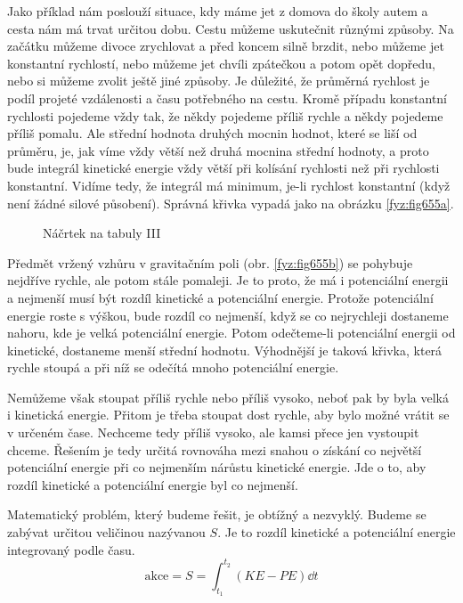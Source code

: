     Jako příklad nám poslouží situace, kdy máme jet z domova do školy autem a cesta nám má trvat
    určitou dobu. Cestu můžeme uskutečnit různými způsoby. Na začátku můžeme divoce zrychlovat a
    před koncem silně brzdit, nebo můžeme jet konstantní rychlostí, nebo můžeme jet chvíli zpátečkou
    a potom opět dopředu, nebo si můžeme zvolit ještě jiné způsoby. Je důležité, že průměrná
    rychlost je podíl projeté vzdálenosti a času potřebného na cestu. Kromě případu konstantní
    rychlosti pojedeme vždy tak, že někdy pojedeme příliš rychle a někdy pojedeme příliš pomalu. Ale
    střední hodnota druhých mocnin hodnot, které se liší od průměru, je, jak víme vždy větší než
    druhá mocnina střední hodnoty, a proto bude integrál kinetické energie vždy větší při kolísání
    rychlosti než při rychlosti konstantní. Vidíme tedy, že integrál má minimum, je-li rychlost
    konstantní (když není žádné silové působení). Správná křivka vypadá jako na obrázku
    \ref{fyz:fig655a}.
    
    \begin{figure}[ht!]
      \centering
        \hfill
      \caption{Náčrtek na tabuly III}
      \label{fyz:fig655}
    \end{figure}

    Předmět vržený vzhůru v gravitačním poli (obr. \ref{fyz:fig655b}) se pohybuje nejdříve rychle,
    ale potom stále pomaleji. Je to proto, že má i potenciální energii a nejmenší musí být rozdíl
    kinetické a potenciální energie. Protože potenciální energie roste s výškou, bude rozdíl co
    nejmenší, když se co nejrychleji dostaneme nahoru, kde je velká potenciální energie. Potom
    odečteme-li potenciální energii od kinetické, dostaneme menší střední hodnotu. Výhodnější je
    taková křivka, která rychle stoupá a při níž se odečítá mnoho potenciální energie.

    Nemůžeme však stoupat příliš rychle nebo příliš vysoko, neboť pak by byla velká i kinetická
    energie. Přitom je třeba stoupat dost rychle, aby bylo možné vrátit se v určeném čase. Nechceme
    tedy příliš vysoko, ale kamsi přece jen vystoupit chceme. Řešením je tedy určitá rovnováha mezi
    snahou o získání co největší potenciální energie při co nejmenším nárůstu kinetické energie. Jde
    o to, aby rozdíl kinetické a potenciální energie byl co nejmenší.

    Matematický problém, který budeme řešit, je obtížný a nezvyklý. Budeme se zabývat určitou
    veličinou nazývanou  \(S\). Je to rozdíl kinetické a potenciální energie
    integrovaný podle času.
    \begin{equation*}
      \text{akce} = S = \int_{t_1}^{t_2}\left(KE - PE\right)\dd{t}
    \end{equation*}


